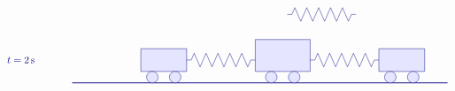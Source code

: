 \begin{solution}
\begin{itemize}
\begin{equation*}
\begin{tikzpicture}[scale=0.8, color=blue!50!black]
\begin{scope}[yshift=-2cm]
\begin{scope}[xshift=4cm]
          \end{scope}
          \begin{scope}[xshift=9.4cm]
            \draw (0,1) -- ++(0.2,0) -- ++(0.13,0.3)
            -- ++(0.26,-0.6) -- ++(0.26,0.6)
            -- ++(0.26,-0.6) -- ++(0.26,0.6)
            -- ++(0.26,-0.6) -- ++(0.26,0.6)
            -- ++(0.26,-0.6) -- ++(0.26,0.6)
            -- ++(0.26,-0.6) -- ++(0.13,0.3)
            -- ++(0.2,0);
          \end{scope}
        \end{scope}
        \begin{scope}[yshift=-4cm]
          \draw (-3,1) node[right] {$t=2\s$};
          \draw[thick] (0,0) -- (16.4,0);
          \begin{scope}[xshift=1cm]
            \draw[fill=blue!10] (2,0.5) rectangle (4,1.5);
            \draw[fill=blue!10] (2.5,0.25) circle (0.25);
            \draw[fill=blue!10] (3.5,0.25) circle (0.25);
          \end{scope}
          \begin{scope}[xshift=6.2cm]
            \draw[fill=blue!10] (1.8,0.5) rectangle (4.2,1.9);
            \draw[fill=blue!10] (2.5,0.25) circle (0.25);
            \draw[fill=blue!10] (3.5,0.25) circle (0.25);
          \end{scope}
          \begin{scope}[xshift=11.4cm]
            \draw[fill=blue!10] (2,0.5) rectangle (4,1.5);
            \draw[fill=blue!10] (2.5,0.25) circle (0.25);
            \draw[fill=blue!10] (3.5,0.25) circle (0.25);
          \end{scope}
          \begin{scope}[xshift=5cm]
            \draw (0,1) -- ++(0.2,0) -- ++(0.13,0.3)
            -- ++(0.26,-0.6) -- ++(0.26,0.6)
            -- ++(0.26,-0.6) -- ++(0.26,0.6)
            -- ++(0.26,-0.6) -- ++(0.26,0.6)
            -- ++(0.26,-0.6) -- ++(0.26,0.6)
            -- ++(0.26,-0.6) -- ++(0.13,0.3)
            -- ++(0.2,0);
          \end{scope}
          \begin{scope}[xshift=10.4cm]
            \draw (0,1) -- ++(0.2,0) -- ++(0.13,0.3)
            -- ++(0.26,-0.6) -- ++(0.26,0.6)
            -- ++(0.26,-0.6) -- ++(0.26,0.6)
            -- ++(0.26,-0.6) -- ++(0.26,0.6)
            -- ++(0.26,-0.6) -- ++(0.26,0.6)
            -- ++(0.26,-0.6) -- ++(0.13,0.3)
            -- ++(0.2,0);
          \end{scope}
        \end{scope}

\end{tikzpicture}
\end{equation*}
\end{itemize}
\end{solution}

